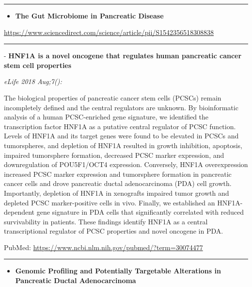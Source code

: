 \documentclass[]{article}
\providecommand{\tightlist}{%
  \setlength{\itemsep}{0pt}\setlength{\parskip}{0pt}}
\begin{document}
\begin{center}\rule{0.5\linewidth}{\linethickness}\end{center}

\begin{itemize}
\tightlist
\item
  \textbf{The Gut Microbiome in Pancreatic Disease}
\end{itemize}

\url{https://www.sciencedirect.com/science/article/pii/S1542356518308838}

\begin{center}\rule{0.5\linewidth}{\linethickness}\end{center}

 - \textbf{HNF1A is a novel oncogene that regulates human pancreatic
cancer stem cell properties}

\emph{eLife 2018 Aug;7():}

The biological properties of pancreatic cancer stem cells (PCSCs) remain
incompletely defined and the central regulators are unknown. By
bioinformatic analysis of a human PCSC-enriched gene signature, we
identified the transcription factor HNF1A as a putative central
regulator of PCSC function. Levels of HNF1A and its target genes were
found to be elevated in PCSCs and tumorspheres, and depletion of HNF1A
resulted in growth inhibition, apoptosis, impaired tumorsphere
formation, decreased PCSC marker expression, and downregulation of
POU5F1/OCT4 expression. Conversely, HNF1A overexpression increased PCSC
marker expression and tumorsphere formation in pancreatic cancer cells
and drove pancreatic ductal adenocarcinoma (PDA) cell growth.
Importantly, depletion of HNF1A in xenografts impaired tumor growth and
depleted PCSC marker-positive cells in vivo. Finally, we established an
HNF1A-dependent gene signature in PDA cells that significantly
correlated with reduced survivability in patients. These findings
identify HNF1A as a central transcriptional regulator of PCSC properties
and novel oncogene in PDA.

PubMed: \url{https://www.ncbi.nlm.nih.gov/pubmed/?term=30074477}

{}

{}

\begin{center}\rule{0.5\linewidth}{\linethickness}\end{center}

\begin{itemize}
\tightlist
\item
  \textbf{Genomic Profiling and Potentially Targetable Alterations in
  Pancreatic Ductal Adenocarcinoma}
\end{itemize}
\end{document}
